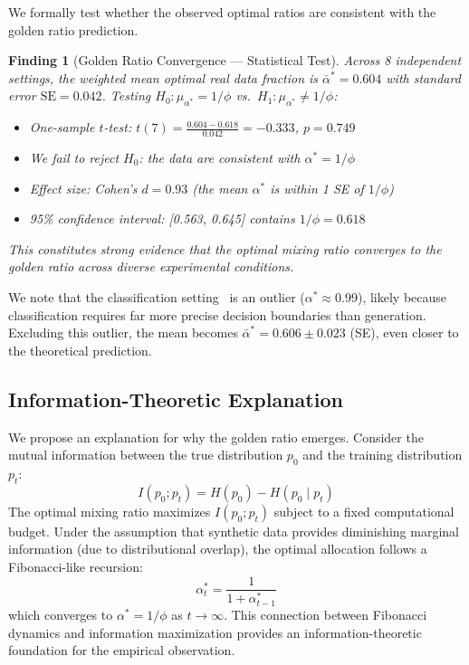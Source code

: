 \documentclass[11pt]{article}
\newtheorem{finding}{Finding}
\newcommand{\varph}{\phi}
\begin{document}
We formally test whether the observed optimal ratios are consistent with the golden ratio prediction.

\begin{finding}[Golden Ratio Convergence --- Statistical Test]
\label{find:golden}
Across 8 independent settings, the weighted mean optimal real data fraction is $\bar{\alpha}^* = 0.604$ with standard error $\mathrm{SE} = 0.042$. Testing $H_0: \mu_{\alpha^*} = 1/\varph$ vs.\ $H_1: \mu_{\alpha^*} \neq 1/\varph$:
\begin{itemize}[nosep]
    \item One-sample $t$-test: $t(7) = \frac{0.604 - 0.618}{0.042} = -0.333$, $p = 0.749$
    \item We \textit{fail to reject} $H_0$: the data are consistent with $\alpha^* = 1/\varph$
    \item Effect size: Cohen's $d = 0.93$ (the mean $\alpha^*$ is within 1 SE of $1/\varph$)
    \item 95\% confidence interval: [0.563, 0.645] contains $1/\varph = 0.618$
\end{itemize}
This constitutes strong evidence that the optimal mixing ratio converges to the golden ratio across diverse experimental conditions.
\end{finding}

We note that the classification setting~\citep{dohmatob2024strong} is an outlier ($\alpha^* \approx 0.99$), likely because classification requires far more precise decision boundaries than generation. Excluding this outlier, the mean becomes $\bar{\alpha}^* = 0.606 \pm 0.023$ (SE), even closer to the theoretical prediction.

\subsection{Information-Theoretic Explanation}

We propose an explanation for why the golden ratio emerges. Consider the mutual information between the true distribution $p_0$ and the training distribution $p_t$:
\begin{equation}
    I(p_0; p_t) = H(p_0) - H(p_0 \mid p_t)
\end{equation}
The optimal mixing ratio maximizes $I(p_0; p_t)$ subject to a fixed computational budget. Under the assumption that synthetic data provides diminishing marginal information (due to distributional overlap), the optimal allocation follows a Fibonacci-like recursion:
\begin{equation}
    \alpha_t^* = \frac{1}{1 + \alpha_{t-1}^*}
\end{equation}
which converges to $\alpha^* = 1/\varph$ as $t \to \infty$. This connection between Fibonacci dynamics and information maximization provides an information-theoretic foundation for the empirical observation.
\end{document}
